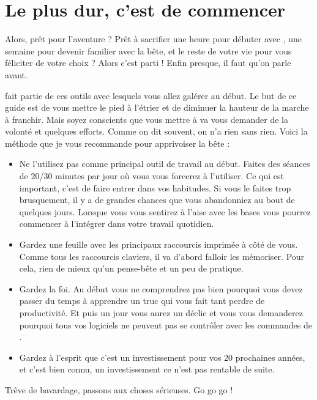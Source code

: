 \section{Le plus dur, c'est de commencer}

Alors, prêt pour l'aventure ? Prêt à sacrifier une heure pour débuter avec \vim, une semaine pour devenir familier avec la bête, et le reste de votre vie pour vous féliciter de votre choix ? Alors c'est parti ! Enfin presque, il faut qu'on parle avant.

\vim fait partie de ces outils avec lesquels vous allez galérer au début. Le but de ce guide est de vous mettre le pied à l'étrier et de diminuer la hauteur de la marche à franchir. Mais soyez conscients que vous mettre à \vim va vous demander de la volonté et quelques efforts. Comme on dit souvent, on n'a rien sans rien. Voici la méthode que je vous recommande pour apprivoiser la bête :

\begin{itemize}
    \item Ne l'utilisez pas comme principal outil de travail au début. Faites des séances de 20/30 minutes par jour où vous vous forcerez à l'utiliser. Ce qui est important, c'est de faire entrer \vim dans vos habitudes. Si vous le faites trop brusquement, il y a de grandes chances que vous abandonniez au bout de quelques jours. Lorsque vous vous sentirez à l'aise avec les bases vous pourrez commencer à l'intégrer dans votre travail quotidien.
    \item Gardez une feuille avec les principaux raccourcis imprimée à côté de vous. Comme tous les raccourcis claviers, il va d'abord falloir les mémoriser. Pour cela, rien de mieux qu'un pense-bête et un peu de pratique.
    \item Gardez la foi. Au début vous ne comprendrez pas bien pourquoi vous devez passer du temps à apprendre un truc qui vous fait tant perdre de productivité. Et puis un jour vous aurez un déclic et vous vous demanderez pourquoi tous vos logiciels ne peuvent pas se contrôler avec les commandes de \vim.
    \item Gardez à l'esprit que c'est un investissement pour vos 20 prochaines années, et c'est bien connu, un investissement ce n'est pas rentable de suite.
\end{itemize}

\bigskip

Trêve de bavardage, passons aux choses sérieuses. Go go go !
